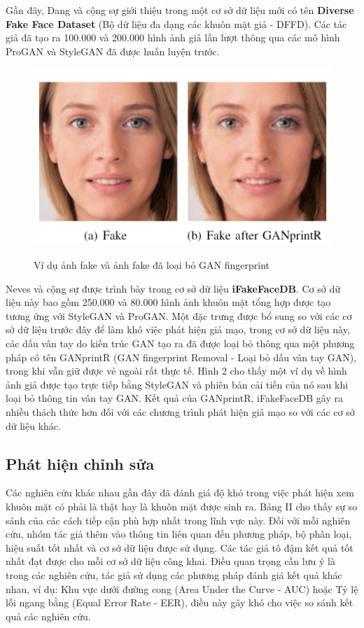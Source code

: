 \documentclass{article}
\begin{document}
Gần đây, Dang và cộng sự giới thiệu trong  một cơ sở dữ liệu mới có tên \textbf{Diverse Fake Face Dataset} (Bộ dữ liệu đa dạng các khuôn mặt giả - DFFD). Các tác giả đã tạo ra 100.000 và 200.000 hình ảnh giả lần lượt thông qua các mô hình ProGAN và StyleGAN đã được huấn luyện trước.

\begin{figure}[h!]
\caption{Ví dụ ảnh fake và ảnh fake đã loại bỏ GAN fingerprint}
\includegraphics[width=\columnwidth]{fig-2-example}
\label{fig-2-example}
\end{figure}

Neves và cộng sự được trình bày trong  cơ sở dữ liệu \textbf{iFakeFaceDB}. Cơ sở dữ liệu này bao gồm 250.000 và 80.000 hình ảnh khuôn mặt tổng hợp được tạo tương ứng với StyleGAN và ProGAN. Một đặc trưng được bổ sung so với các cơ sở dữ liệu trước đây để làm khó việc phát hiện giả mạo, trong cơ sở dữ liệu này, các dấu vân tay do kiến trúc GAN tạo ra đã được loại bỏ thông qua một phương pháp có tên GANprintR (GAN fingerprint Removal - Loại bỏ dấu vân tay GAN), trong khi vẫn giữ được vẻ ngoài rất thực tế. Hình 2 cho thấy một ví dụ về hình ảnh giả được tạo trực tiếp bằng StyleGAN và phiên bản cải tiến của nó sau khi loại bỏ thông tin vân tay GAN. Kết quả của GANprintR, iFakeFaceDB gây ra nhiều thách thức hơn đối với các chương trình phát hiện giả mạo so với các cơ sở dữ liệu khác.

\subsection{Phát hiện chỉnh sửa} \label{sec:3-b-dectector}

Các nghiên cứu khác nhau gần đây đã đánh giá độ khó trong việc phát hiện xem khuôn mặt có phải là thật hay là khuôn mặt được sinh ra. Bảng II cho thấy sự so sánh của các cách tiếp cận phù hợp nhất trong lĩnh vực này. Đối với mỗi nghiên cứu, nhóm tác giả thêm vào thông tin liên quan đến phương pháp, bộ phân loại, hiệu suất tốt nhất và cơ sở dữ liệu được sử dụng. Các tác giả tô đậm kết quả tốt nhất đạt được cho mỗi cơ sở dữ liệu công khai. Điều quan trọng cần lưu ý là trong các nghiên cứu, tác giả sử dụng các phương pháp đánh giá kết quả khác nhau, ví dụ: Khu vực dưới đường cong (Area Under the Curve - AUC) hoặc Tỷ lệ lỗi ngang bằng (Equal Error Rate - EER), điều này gây khó cho việc so sánh kết quả các nghiên cứu.
\end{document}
